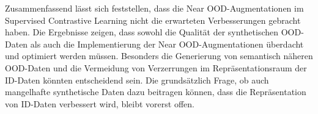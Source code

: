 Zusammenfassend lässt sich feststellen, dass die Near OOD-Augmentationen im Supervised Contrastive Learning nicht die erwarteten Verbesserungen gebracht haben. Die Ergebnisse zeigen, dass sowohl die Qualität der synthetischen OOD-Daten als auch die Implementierung der Near OOD-Augmentationen überdacht und optimiert werden müssen. Besonders die Generierung von semantisch näheren OOD-Daten und die Vermeidung von Verzerrungen im Repräsentationsraum der ID-Daten könnten entscheidend sein. Die grundsätzlich Frage, ob auch mangelhafte synthetische Daten dazu beitragen können, dass die Repräsentation von ID-Daten verbessert wird, bleibt vorerst offen.